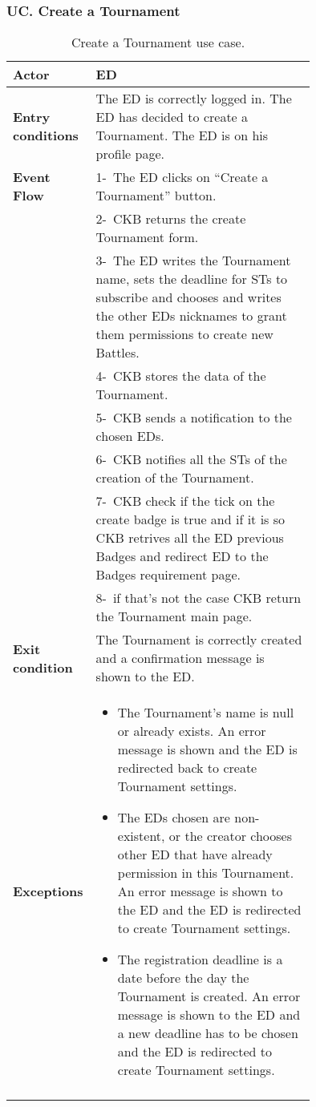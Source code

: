 \subsubsection*{UC\cuc . Create a Tournament}
\begin{center}
    \begin{longtable}{|l|p{0.75\linewidth}|}
        \hline
        \textbf{Actor}            & ED\\
        \hline
        \textbf{Entry conditions} & The ED is correctly logged in. The ED has decided to create a Tournament. The ED is on his profile page. \\
        \hline
        \textbf{Event Flow}       & 1-\ The ED clicks on “Create a Tournament” button.       \\
        & 2-\ CKB returns the create Tournament form.   \\
        & 3-\ The ED writes the Tournament name, sets the deadline for STs to subscribe and chooses and writes the other EDs nicknames to grant them permissions to create new Battles.        \\
        & 4-\ CKB stores the data of the Tournament.        \\
        & 5-\ CKB sends a notification to the chosen EDs.        \\
        & 6-\ CKB notifies all the STs of the creation of the Tournament.        \\
        & 7-\ CKB check if the tick on the create badge is true and if it is so CKB retrives all the ED previous Badges and redirect ED to the Badges requirement page.\\
        & 8-\ if that's not the case CKB return the Tournament main page. \\
        \hline
        \textbf{Exit condition}   & The Tournament is correctly created and a confirmation message is shown to the ED.        \\
        \hline
        \textbf{Exceptions}        & \begin{itemize}
            \item The Tournament’s name is null or already exists. An error message is shown and the ED is redirected back to create Tournament settings.
            \item The EDs chosen are non-existent, or the creator chooses other ED that have already permission in this Tournament. An error message is shown to the ED and the ED is redirected to create Tournament settings.
            \item The registration deadline is a date before the day the Tournament is created. An error message is shown to the ED and a new deadline has to be chosen and the ED  is redirected to create Tournament settings.
         \end{itemize}    \\
        \hline
        \caption{Create a Tournament use case.}
        \label{tab: create_a_Tournament_use_case}
    \end{longtable}
\end{center}

